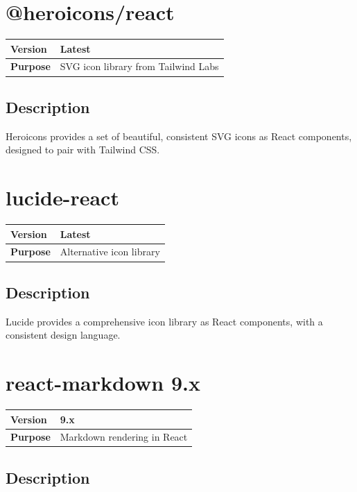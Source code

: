 \documentclass[12pt,a4paper]{report}
\begin{document}
\section{@heroicons/react}

\begin{tabular}{|p{4cm}|p{10cm}|}
\hline
\textbf{Version} & Latest \\
\hline
\textbf{Purpose} & SVG icon library from Tailwind Labs \\
\hline
\end{tabular}

\subsection{Description}

Heroicons provides a set of beautiful, consistent SVG icons as React components, designed to pair with Tailwind CSS.

\section{lucide-react}

\begin{tabular}{|p{4cm}|p{10cm}|}
\hline
\textbf{Version} & Latest \\
\hline
\textbf{Purpose} & Alternative icon library \\
\hline
\end{tabular}

\subsection{Description}

Lucide provides a comprehensive icon library as React components, with a consistent design language.

\section{react-markdown 9.x}

\begin{tabular}{|p{4cm}|p{10cm}|}
\hline
\textbf{Version} & 9.x \\
\hline
\textbf{Purpose} & Markdown rendering in React \\
\hline
\end{tabular}

\subsection{Description}
\end{document}

